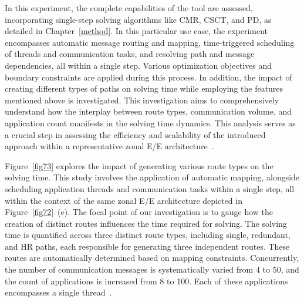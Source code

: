     In this experiment, the complete capabilities of the tool are assessed, incorporating single-step solving algorithms like CMR, CSCT, and PD, as detailed in Chapter~\ref{method}. In this particular use case, the experiment encompasses automatic message routing and mapping, time-triggered scheduling of threads and communication tasks, and resolving path and message dependencies, all within a single step. Various optimization objectives and boundary constraints are applied during this process. In addition, the impact of creating different types of paths on solving time while employing the features mentioned above is investigated. This investigation aims to comprehensively understand how the interplay between route types, communication volume, and application count manifests in the solving time dynamics. This analysis serves as a crucial step in assessing the efficiency and scalability of the introduced approach within a representative zonal E/E architecture~\cite{askaripoor2023designer}.



    
    
     Figure~\ref{fig73} explores the impact of generating various route types on the solving time. This study involves the application of automatic mapping, alongside scheduling application threads and communication tasks within a single step, all within the context of the same zonal E/E architecture depicted in Figure~\ref{fig72}~(e). The focal point of our investigation is to gauge how the creation of distinct routes influences the time required for solving.
     The solving time is quantified across three distinct route types, including single, redundant, and HR paths, each responsible for generating three independent routes. These routes are automatically determined based on mapping constraints. Concurrently, the number of communication messages is systematically varied from 4 to 50, and the count of applications is increased from 8 to 100. Each of these applications encompasses a single thread~\cite{askaripoor2023designer}.
     

